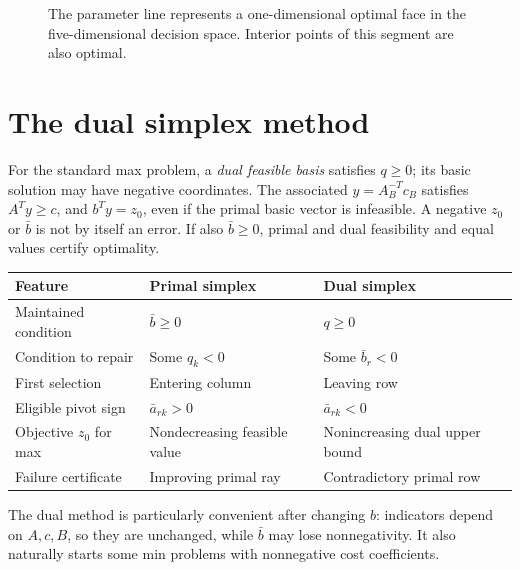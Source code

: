 \documentclass[11pt,a4paper]{article}
\begin{document}
\begin{figure}[H]
  \centering
  \caption{The parameter line represents a one-dimensional optimal face in the
    five-dimensional decision space. Interior points of this segment are also optimal.}
\end{figure}

\section{The dual simplex method}\label{sec:dual-simplex}
\begin{lecturecore}
  For the standard max problem, a \emph{dual feasible basis} satisfies $q\geq0$;
  its basic solution may have negative coordinates. The associated
  $y=A_B^{-T}c_B$ satisfies $A^Ty\geq c$, and $b^Ty=z_0$, even if the primal
  basic vector is infeasible. A negative $z_0$ or $\bar b$ is not by itself an error.
  If also $\bar b\geq0$, primal and dual feasibility and equal values certify
  optimality.
\end{lecturecore}
\begin{center}
  \begin{tabular}{lll}\toprule
    Feature & Primal simplex & Dual simplex\\\midrule
    Maintained condition & $\bar b\geq0$ & $q\geq0$\\
    Condition to repair & Some $q_k<0$ & Some $\bar b_r<0$\\
    First selection & Entering column & Leaving row\\
    Eligible pivot sign & $\bar a_{rk}>0$ & $\bar a_{rk}<0$\\
    Objective $z_0$ for max & Nondecreasing feasible value & Nonincreasing dual upper bound\\
    Failure certificate & Improving primal ray & Contradictory primal row\\\bottomrule
  \end{tabular}
\end{center}
The dual method is particularly convenient after changing $b$: indicators
depend on $A,c,B$, so they are unchanged, while $\bar b$ may lose nonnegativity.
It also naturally starts some min problems with nonnegative cost coefficients.
\end{document}

